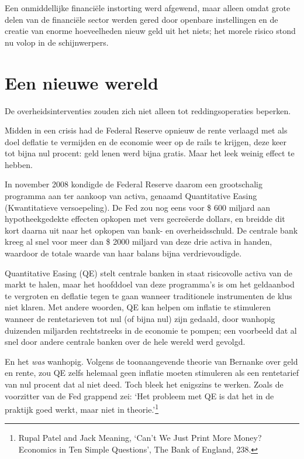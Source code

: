 \documentclass[
  a5paper,
  smalldemyvopaper,11pt,twoside,onecolumn,openright,extrafontsizes]{memoir}
\begin{document}
Een onmiddellijke financiële instorting werd afgewend, maar alleen omdat
grote delen van de financiële sector werden gered door openbare
instellingen en de creatie van enorme hoeveelheden nieuw geld uit het
niets; het morele risico stond nu volop in de schijnwerpers.

\section{Een nieuwe wereld}\label{een-nieuwe-wereld}

De overheidsinterventies zouden zich niet alleen tot reddingsoperaties
beperken.

Midden in een crisis had de Federal Reserve opnieuw de rente verlaagd
met als doel deflatie te vermijden en de economie weer op de rails te
krijgen, deze keer tot bijna nul procent: geld lenen werd bijna gratis.
Maar het leek weinig effect te hebben.

In november 2008 kondigde de Federal Reserve daarom een grootschalig
programma aan ter aankoop van activa, genaamd Quantitative Easing
(Kwantitatieve versoepeling). De Fed zou nog eens voor \$ 600 miljard
aan hypotheekgedekte effecten opkopen met vers gecreëerde dollars, en
breidde dit kort daarna uit naar het opkopen van bank- en
overheidsschuld. De centrale bank kreeg al snel voor meer dan \$ 2000
miljard van deze drie activa in handen, waardoor de totale waarde van
haar balans bijna verdrievoudigde.

Quantitative Easing (QE) stelt centrale banken in staat risicovolle
activa van de markt te halen, maar het hoofddoel van deze programma's is
om het geldaanbod te vergroten en deflatie tegen te gaan wanneer
traditionele instrumenten de klus niet klaren. Met andere woorden, QE
kan helpen om inflatie te stimuleren wanneer de rentetarieven tot nul
(of bijna nul) zijn gedaald, door wanhopig duizenden miljarden
rechtstreeks in de economie te pompen; een voorbeeld dat al snel door
andere centrale banken over de hele wereld werd gevolgd.

En het \emph{was} wanhopig. Volgens de toonaangevende theorie van
Bernanke over geld en rente, zou QE zelfs helemaal geen inflatie moeten
stimuleren als een rentetarief van nul procent dat al niet deed. Toch
bleek het enigszins te werken. Zoals de voorzitter van de Fed grappend
zei: `Het probleem met QE is dat het in de praktijk goed werkt, maar
niet in theorie.'\footnote{Rupal Patel and Jack Meaning, `Can't We Just
  Print More Money? Economics in Ten Simple Questions', The Bank of
  England, 238.}
\end{document}
